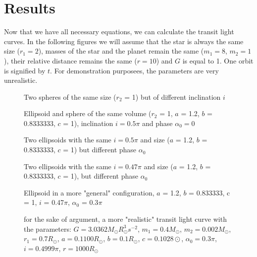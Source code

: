\documentclass[10pt]{article}
\numberwithin{equation}{subsection}
\begin{document}
\section{Results}
Now that we have all necessary equations, we can calculate the transit light curves.
In the following figures we will assume that the star is always the same size ($r_1 = 2$),
masses of the star and the planet remain the same ($m_1 = 8$, $m_2 = 1$), their relative
distance remains the same ($r = 10$) and $G$ is equal to 1. One orbit is signified by $t$.
For demonstration purposees, the parameters are very unrealistic.
\begin{figure}[H]
  \centering
  
  \caption{Two spheres of the same size ($r_2$ = 1) but of different inclination $i$}
\end{figure}
\begin{figure}[H]
  \centering
  
  \caption{Ellipsoid and sphere of the same volume ($r_2$ = 1, $a$ = 1.2, $b$ = 0.8333333, $c$ = 1), inclination $i=0.5\pi$ and phase $\alpha_0 = 0$}
\end{figure}
\begin{figure}[H]
  \centering
  
  \caption{Two ellipsoids with the same $i = 0.5\pi$ and size ($a$ = 1.2, $b$ = 0.8333333, $c$ = 1) but different phase $\alpha_0$}
\end{figure}
\begin{figure}[H]
  \centering
  
  \caption{Two ellipsoids with the same $i = 0.47\pi$ and size ($a$ = 1.2, $b$ = 0.8333333, $c$ = 1), but different phase $\alpha_0$}
\end{figure}
\begin{figure}[H]
  \centering
  
  \caption{Ellipsoid in a more "general" configuration, $a$ = 1.2, $b$ = 0.833333, c = 1, $i$ = 0.47$\pi$, $\alpha_0$ = 0.3$\pi$}
\end{figure}
\begin{figure}[H]
  \centering
  
  \caption{for the sake of argument, a more "realistic" transit light curve with the parameters:
  $G = 3.0362M_\odot R^3_\odot s^{-2}$, $m_1 = 0.4M_\odot$, $m_2 = 0.002M_\odot$, $r_1 = 0.7R_\odot$, $a = 0.1100R_\odot$, $b = 0.1R_\odot$, $c = 0.1028\odot$, $\alpha_0 = 0.3\pi$, $i = 0.4999\pi$, $r = 1000R_\odot$}
  \label{fig:6}
\end{figure}
\end{document}
